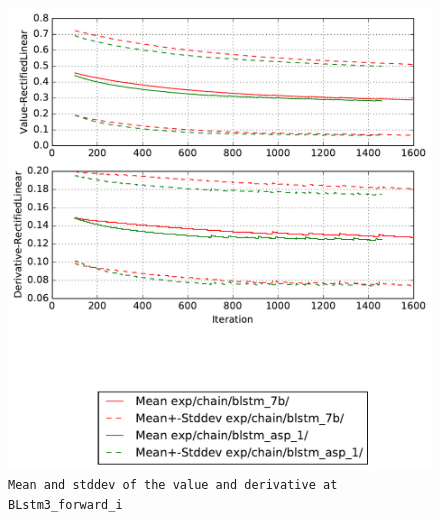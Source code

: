 \documentclass[prl,10pt,twocolumn]{revtex4}
\begin{document}
\newpage
\begin{figure}[h]
  \begin{center}
    \caption{\texttt{Mean and stddev of the value and derivative at BLstm3\_forward\_i}}
    \includegraphics[width=\textwidth]{exp/chain/blstm_7b/report/nonlinstats_BLstm3_forward_i.pdf}
  \end{center}
\end{figure}
\clearpage
\end{document}
